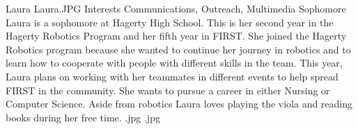 \insertbio
{Laura}
{Laura.JPG}
{Interests}
{Communications, Outreach, Multimedia}
{Sophomore}
{
Laura is a sophomore at Hagerty High School. This is her second year in the Hagerty Robotics Program and her fifth year in FIRST. She joined the Hagerty Robotics program because she wanted to continue her journey in robotics and to learn how to cooperate with people with different skills in the team. This year, Laura plans on working with her teammates in different events to help spread FIRST in the community. She wants to pursue a career in either Nursing or Computer Science. Aside from robotics Laura loves playing the viola and reading books during her free time.
}
{.jpg}
{.jpg}
